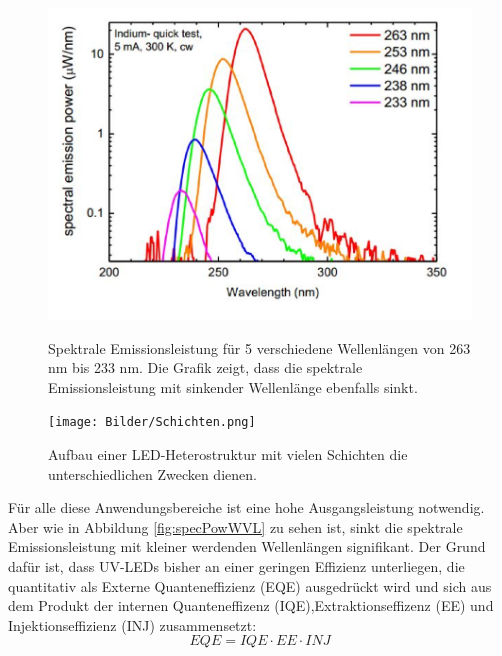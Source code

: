 %
\begin{figure}[htb]
    \centering
    \begin{minipage}[t]{0.49\linewidth}
        \centering
        \includegraphics[width=\linewidth]{Bilder/SpectralEmissionPower_Wavelength.png}
        \caption{Spektrale Emissionsleistung für 5 verschiedene Wellenlängen von 263 nm bis 233 nm. Die Grafik zeigt, dass die spektrale Emissionsleistung mit sinkender Wellenlänge ebenfalls sinkt\cite{semreich}.}
        \label{fig:specPowWVL}
    \end{minipage}
    \hfill
    \begin{minipage}[t]{0.49\linewidth}
        \centering
        \texttt{[image: Bilder/Schichten.png]}
        \caption{Aufbau einer LED-Heterostruktur mit vielen Schichten die unterschiedlichen Zwecken dienen.}
        \label{fig:schichtenLED}
    \end{minipage}
\end{figure}
\noindent
%
Für alle diese Anwendungsbereiche ist eine hohe Ausgangsleistung notwendig. Aber wie in Abbildung \ref{fig:specPowWVL} zu sehen ist, sinkt die spektrale Emissionsleistung mit kleiner werdenden Wellenlängen signifikant. Der Grund dafür ist, dass UV-LEDs bisher an einer geringen Effizienz unterliegen, die quantitativ als Externe Quanteneffizienz (EQE) ausgedrückt wird und sich aus dem Produkt der internen Quanteneffizenz (IQE),Extraktionseffizenz (EE) und Injektionseffizienz (INJ) zusammensetzt:
%
\begin{equation}
    EQE = IQE \cdot EE \cdot INJ
\end{equation}
%
